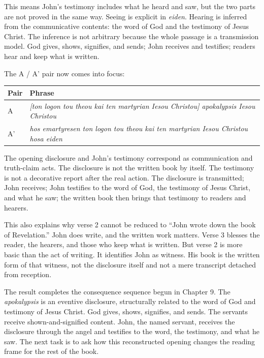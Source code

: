 This means John's testimony includes what he heard and saw, but the two parts are not proved in the same way. Seeing is explicit in \textit{eiden}. Hearing is inferred from the communicative contents: the word of God and the testimony of Jesus Christ. The inference is not arbitrary because the whole passage is a transmission model. God gives, shows, signifies, and sends; John receives and testifies; readers hear and keep what is written.

The A / A' pair now comes into focus:

\begin{center}
\begin{longtable}{@{}p{}p{}@{}}
\toprule
Pair & Phrase \\
\midrule
A & \textit{[ton logon tou theou kai ten martyrian Iesou Christou] apokalypsis Iesou Christou} \\
A' & \textit{hos emartyresen ton logon tou theou kai ten martyrian Iesou Christou hosa eiden} \\
\bottomrule
\end{longtable}
\end{center}

The opening disclosure and John's testimony correspond as communication and truth-claim acts. The disclosure is not the written book by itself. The testimony is not a decorative report after the real action. The disclosure is transmitted; John receives; John testifies to the word of God, the testimony of Jesus Christ, and what he saw; the written book then brings that testimony to readers and hearers.

This also explains why verse 2 cannot be reduced to ``John wrote down the book of Revelation.'' John does write, and the written work matters. Verse 3 blesses the reader, the hearers, and those who keep what is written. But verse 2 is more basic than the act of writing. It identifies John as witness. His book is the written form of that witness, not the disclosure itself and not a mere transcript detached from reception.

The result completes the consequence sequence begun in Chapter 9. The \textit{apokalypsis} is an eventive disclosure, structurally related to the word of God and testimony of Jesus Christ. God gives, shows, signifies, and sends. The servants receive shown-and-signified content. John, the named servant, receives the disclosure through the angel and testifies to the word, the testimony, and what he saw. The next task is to ask how this reconstructed opening changes the reading frame for the rest of the book.
